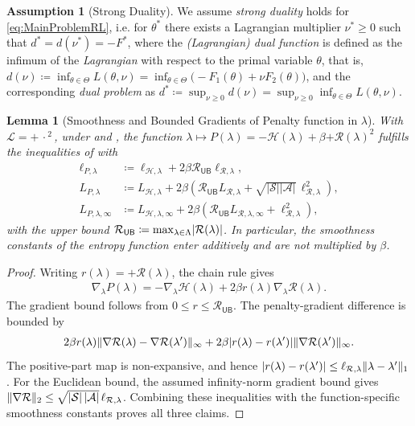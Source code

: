 \documentclass[10pt,a4paper]{amsart}
\def\AA{{\mathcal{A}}}
\def\Fopt{{F^*}}
\def\HH{{\mathcal{H}}}
\def\Reg{{\mathcal{R}}}
\def\RegMax{{\mathcal{R}_{\mathsf{UB}}}}
\def\SS{{\mathcal{S}}}
\def\XX{{\Theta}}
\DeclarePairedDelimiter{\abs}{\lvert}{\rvert}
\providecommand{\card}[1]{\left|#1\right|}
\def\dOpt{{d^*}}
\providecommand{\define}{\coloneqq}
\providecommand{\innerEmpty}{\,\cdot\,}
\DeclarePairedDelimiter{\norm}{\lVert}{\rVert}
\def\nuOpt{{\nu^{*}}}
\providecommand{\pen}[1]{{\plus{#1}^2}}
\providecommand{\penGenNot}{{\mathcal{L}}}
\DeclarePairedDelimiter{\plus}{[}{]_{+}}
\def\xx{{\theta}}
\def\xxOpt{\xx^{*}}
\theoremstyle{plain}
\newtheorem{lemma}[theorem]{Lemma}
\theoremstyle{definition}
\newtheorem{assumption}[theorem]{Assumption}
\theoremstyle{remark}
\begin{document}
\setcounter{theorem}{4}
\begin{assumption}[Strong Duality]
 \label{ass:StrongDuality}
 We assume \emph{strong duality} holds for \eqref{eq:MainProblemRL},
 i.e. for $\xxOpt$ there exists a Lagrangian multiplier
 $\nuOpt \geq 0$ such that $\dOpt = d(\nuOpt) = -\Fopt$, where
 the \emph{(Lagrangian) dual function} is defined as
 the infimum of the \emph{Lagrangian} with respect to the primal variable $\xx$, that is,
 $d(\nu)\define\inf_{\xx\in\XX}L(\xx,\nu)
  =\inf_{\xx\in\XX}\bigl(-F_1(\xx)+\nu F_2(\xx)\bigr)$,
 and the corresponding \emph{dual problem} as
 $\dOpt \define \sup_{\nu \geq 0} d(\nu)
  = \sup_{\nu \geq 0} \inf_{\xx \in \XX} L(\xx, \nu)$.
\end{assumption}

\appendix
\setcounter{section}{2}
\setcounter{theorem}{2}
\begin{lemma}[Smoothness and Bounded Gradients of Penalty
  function in $\lambda$]
 \label{lem:AppendixSmoothnessBoundedGradientsPenaltyLambda}
 With $\penGenNot = \pen{\innerEmpty{}}$, under
  and
 , the
 function $\lambda \mapsto P(\lambda)
  =-\HH(\lambda)+\beta\pen{\Reg(\lambda)}$
 fulfills the inequalities of  with
 \begin{align*}
  \ell_{P,\lambda}
   & \define \ell_{\HH,\lambda}
  +2\beta\RegMax\ell_{\Reg,\lambda},                          \\
  L_{P,\lambda}
   & \define L_{\HH,\lambda}
  +2\beta\left(\RegMax L_{\Reg,\lambda}
  +\sqrt{\card{\SS}\card{\AA}}\,\ell_{\Reg,\lambda}^2\right), \\
  L_{P,\lambda,\infty}
   & \define L_{\HH,\lambda,\infty}
  +2\beta\left(\RegMax L_{\Reg,\lambda,\infty}
  +\ell_{\Reg,\lambda}^2\right),
 \end{align*}
 with the upper bound $\RegMax \define \max_{\lambda \in \Lambda} \abs{\Reg(\lambda)}$.
 In particular, the smoothness constants of the entropy function
 enter additively and are not multiplied by $\beta$.
\end{lemma}
\begin{proof}
 Writing $r(\lambda)=\plus{\Reg(\lambda)}$, the chain rule gives
 \begin{align*}
  \nabla_\lambda P(\lambda)
  =-\nabla_\lambda\HH(\lambda)
  +2\beta r(\lambda)\nabla_\lambda\Reg(\lambda).
 \end{align*}
 The gradient bound follows from $0\leq r\leq\RegMax$.
 The penalty-gradient difference is bounded by
 \begin{align*}
  2\beta r(\lambda)
  \norm{\nabla\Reg(\lambda)-\nabla\Reg(\lambda^\prime)}_\infty
  +2\beta\abs{r(\lambda)-r(\lambda^\prime)}
  \norm{\nabla\Reg(\lambda^\prime)}_\infty.
 \end{align*}
 The positive-part map is non-expansive, and hence
 $\abs{r(\lambda)-r(\lambda^\prime)}
  \leq\ell_{\Reg,\lambda}\norm{\lambda-\lambda^\prime}_1$.
 For the Euclidean bound, the assumed infinity-norm gradient bound gives
 $\norm{\nabla\Reg}_2\leq
  \sqrt{\card{\SS}\card{\AA}}\,\ell_{\Reg,\lambda}$.
 Combining these inequalities with the function-specific smoothness
 constants proves all three claims.
\end{proof}
\end{document}
